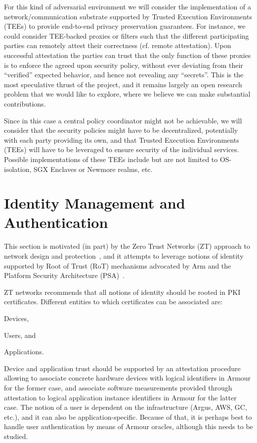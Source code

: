 \documentclass[a4paper]{article}
\newcommand{\armour}{{\sc Armour}}
\newcommand{\ZT}{{\sc ZT}}
\newcommand{\rot}{RoT}
\newcommand{\psa}{PSA}
\begin{document}
\begin{enumerate}
  For this kind of adversarial environment we will consider the
  implementation of a network/communication substrate supported by
  Trusted Execution Environments (TEEs) to provide end-to-end privacy
  preservation guarantees.
  For instance, we could consider TEE-backed proxies or filters such
  that the different participating parties can remotely attest their
  correctness (cf. remote attestation).
  Upon successful attestation the parties can trust that the only
  function of these proxies is to enforce the agreed upon security
  policy, without ever deviating from their ``verified'' expected
  behavior, and hence not revealing any ``secrets''. 
  This is the most speculative thrust of the project, and it remains
  largely an open research problem that we would like to explore,
  where we believe we can make substantial contributions. 

  Since in this case a central policy coordinator might not be
  achievable, we will consider that the security policies might have to
  be decentralized, potentially with each party providing its own, and
  that Trusted Execution Environments (TEEs) will have to be leveraged
  to ensure security of the individual services.
  Possible implementations of these TEEs include but are not limited
  to OS-isolation, SGX Enclaves or Newmore realms, etc.
\end{enumerate}


\section{Identity Management and Authentication}
\label{sec:identity-management}

This section is motivated (in part) by the Zero Trust Networks (\ZT{})
approach to network design and protection~\cite{GilmanB17}, and it
attempts to leverage notions of identity supported by Root of Trust
(\rot{}) mechanisms advocated by Arm and the Platform Security
Architecture (\psa{})~\cite{PSA}.

\ZT{} networks recommends that all notions of identity should be
rooted in PKI certificates.
%
Different entities to which certificates can be associated are:
\begin{inparaenum}
\item Devices, 
\item Users, and
\item Applications. 
\end{inparaenum}

Device and application trust should be supported by an attestation
procedure allowing to associate concrete hardware devices with logical
identifiers in \armour{} for the former case, and associate software
measurements provided through attestation to logical application
instance identifiers in \armour{} for the latter case.
%
The notion of a user is dependent on the infrastructure (Argus, AWS,
GC, etc.), and it can also be application-specific.
%
Because of that, it is perhaps best to handle user authentication by
means of \armour{} oracles, although this needs to be studied.
\end{document}
